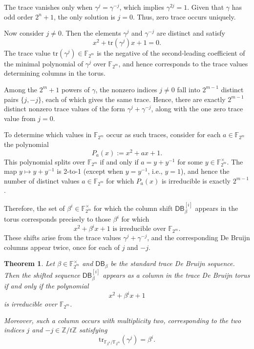 \documentclass{article}
\newtheorem{theorem}{Theorem}[section]
\begin{document}
The trace vanishes only when \( \gamma^j = \gamma^{-j} \), which implies \( \gamma^{2j} = 1 \). Given that \( \gamma \) has odd order \( 2^n + 1 \), the only solution is \( j = 0 \). Thus, zero trace occurs uniquely.

Now consider \( j \ne 0 \). Then the elements \( \gamma^j \) and \( \gamma^{-j} \) are distinct and satisfy
\[
x^2 + \mathrm{tr}(\gamma^j)x + 1 = 0.
\]
The trace value \( \mathrm{tr}(\gamma^j) \in \mathbb{F}_{2^m} \) is the negative of the second-leading coefficient of the minimal polynomial of \( \gamma^j \) over \( \mathbb{F}_{2^m} \), and hence corresponds to the trace values determining columns in the torus.

Among the \(2^{m} + 1 \) powers of \( \gamma \), the nonzero indices \( j \ne 0 \) fall into \( 2^{m-1} \) distinct pairs \( \{j, -j\} \), each of which gives the same trace. Hence, there are exactly \( 2^{m-1} \) distinct nonzero trace values of the form \( \gamma^j + \gamma^{-j} \), along with the one zero trace value from \( j = 0 \).

To determine which values in \( \mathbb{F}_{2^m} \) occur as such traces, consider for each \( a \in \mathbb{F}_{2^m} \) the polynomial
\[
P_a(x) := x^2 + a x + 1.
\]
This polynomial splits over \( \mathbb{F}_{2^m} \) if and only if \( a = y + y^{-1} \) for some \( y \in \mathbb{F}_{2^m}^\times \). The map \( y \mapsto y + y^{-1} \) is 2-to-1 (except when \( y = y^{-1} \), i.e., \( y = 1 \)), and hence the number of distinct values \( a \in \mathbb{F}_{2^m} \) for which \( P_a(x) \) is irreducible is exactly \( 2^{m-1} \).

Therefore, the set of \( \beta^i \in \mathbb{F}_{2^m}^\times \) for which the column shift \( \mathsf{DB}_\beta^{[i]} \) appears in the torus corresponds precisely to those \( \beta^i \) for which
\[
x^2 + \beta^i x + 1 \text{ is irreducible over } \mathbb{F}_{2^m}.
\]
These shifts arise from the trace values \( \gamma^j + \gamma^{-j} \), and the corresponding De Bruijn columns appear twice, once for each of \( j \) and \( -j \).

\begin{theorem}\label{thm:occurrence-criterion}
Let \( \beta \in \mathbb{F}_{2^m}^\times \) and \( \mathsf{DB}_\beta \) be the standard trace De Bruijn sequence. Then the shifted sequence \( \mathsf{DB}_\beta^{[i]} \) appears as a column in the trace De Bruijn torus if and only if the polynomial
\[
x^2 + \beta^i x + 1
\]
is irreducible over \( \mathbb{F}_{2^m} \).

Moreover, such a column occurs with multiplicity two, corresponding to the two indices \( j \) and \( -j \in \mathbb{Z}/t\mathbb{Z} \) satisfying
\[
\mathrm{tr}_{\mathbb{F}_{2^n}/\mathbb{F}_{2^m}}(\gamma^j) = \beta^i.
\]
\end{theorem}
\end{document}
